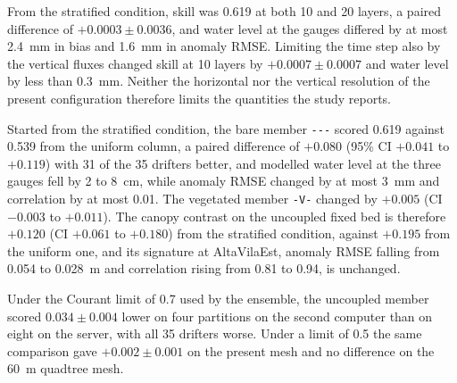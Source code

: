 From the stratified condition, skill was 0.619 at both 10 and 20 layers, a
paired difference of $+0.0003 \pm 0.0036$, and water level at the gauges
differed by at most 2.4~mm in bias and 1.6~mm in anomaly RMSE. Limiting the
time step also by the vertical fluxes changed skill at 10 layers by $+0.0007
\pm 0.0007$ and water level by less than 0.3~mm. Neither the horizontal nor the
vertical resolution of the present configuration therefore limits the
quantities the study reports.

Started from the stratified condition, the bare member \texttt{{-}{-}{-}}
scored 0.619 against 0.539 from the uniform column, a paired difference of
$+0.080$ (95\% CI $+0.041$ to $+0.119$) with 31 of the 35 drifters better, and
modelled water level at the three gauges fell by 2 to 8~cm, while anomaly RMSE
changed by at most 3~mm and correlation by at most 0.01. The vegetated member
\texttt{{-}V{-}} changed by $+0.005$ (CI $-0.003$ to $+0.011$). The canopy
contrast on the uncoupled fixed bed is therefore $+0.120$ (CI $+0.061$ to
$+0.180$) from the stratified condition, against $+0.195$ from the uniform one,
and its signature at AltaVilaEst, anomaly RMSE falling from 0.054 to 0.028~m and
correlation rising from 0.81 to 0.94, is unchanged.

Under the Courant limit of 0.7 used by the ensemble, the uncoupled member scored
$0.034 \pm 0.004$ lower on four partitions on the second computer than on eight
on the server, with all 35 drifters worse. Under a limit of 0.5 the same
comparison gave $+0.002 \pm 0.001$ on the present mesh and no difference on the
60~m quadtree mesh.
